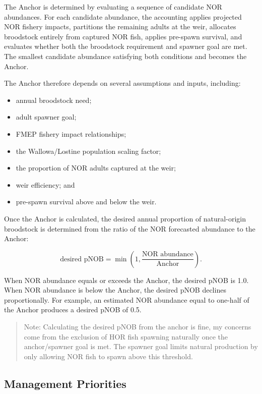 \documentclass[12pt,letterpaper]{article}
\providecommand{\tightlist}{%
  \setlength{\itemsep}{0pt}\setlength{\parskip}{0pt}}
\begin{document}
The Anchor is determined by evaluating a sequence of candidate NOR abundances. For each candidate abundance, the accounting applies projected NOR fishery impacts, partitions the remaining adults at the weir, allocates broodstock entirely from captured NOR fish, applies pre-spawn survival, and evaluates whether both the broodstock requirement and spawner goal are met. The smallest candidate abundance satisfying both conditions and becomes the Anchor.

The Anchor therefore depends on several assumptions and inputs, including:

\begin{itemize}
\tightlist
\item
  annual broodstock need;
\item
  adult spawner goal;
\item
  FMEP fishery impact relationships;
\item
  the Wallowa/Lostine population scaling factor;
\item
  the proportion of NOR adults captured at the weir;
\item
  weir efficiency; and
\item
  pre-spawn survival above and below the weir.
\end{itemize}

Once the Anchor is calculated, the desired annual proportion of natural-origin broodstock is determined from the ratio of the NOR forecasted abundance to the Anchor:

\[
\text{desired pNOB} =
\min\left(1,\frac{\text{NOR abundance}}{\text{Anchor}}\right).
\]

When NOR abundance equals or exceeds the Anchor, the desired pNOB is 1.0. When NOR abundance is below the Anchor, the desired pNOB declines proportionally. For example, an estimated NOR abundance equal to one-half of the Anchor produces a desired pNOB of 0.5.

\begin{quote}
Note: Calculating the desired pNOB from the anchor is fine, my concerns come from the exclusion of HOR fish spawning naturally once the anchor/spawner goal is met. The spawner goal limits natural production by only allowing NOR fish to spawn above this threshold.
\end{quote}

\subsection{Management Priorities}\label{management-priorities}
\end{document}
